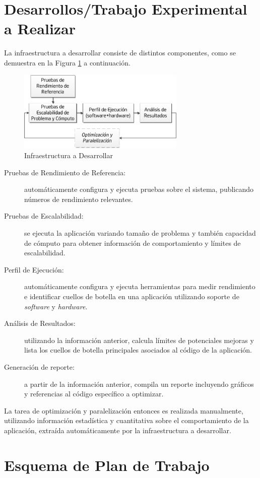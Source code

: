 \documentclass[a4paper]{article}
\begin{document}
\section{Desarrollos/Trabajo Experimental a Realizar}

La infraestructura a desarrollar consiste de distintos componentes, como se demuestra en la Figura \ref{fig:framework} a continuación.

\begin{figure}[H]
\centering
\includegraphics[width=8cm]{framework.png}
\caption{Infraestructura a Desarrollar}
\label{fig:framework}
\end{figure}
  \begin{description}
  \item[Pruebas de Rendimiento de Referencia:] automáticamente configura y ejecuta pruebas sobre el sistema, publicando números de rendimiento relevantes.
 \item[Pruebas de Escalabilidad:] se ejecuta la aplicación variando tamaño de problema y también capacidad de cómputo para obtener información de comportamiento y límites de escalabilidad.
  \item[Perfil de Ejecución:] automáticamente configura y ejecuta herramientas para medir rendimiento e identificar cuellos de botella en una aplicación utilizando soporte de {\it software} y {\it hardware}.
  \item[Análisis de Resultados:] utilizando la información anterior, calcula límites de potenciales mejoras y lista los cuellos de botella principales asociados al código de la aplicación.
  \item[Generación de reporte:] a partir de la información anterior, compila un reporte incluyendo gráficos y referencias al código específico a optimizar.
  \end{description}

La tarea de optimización y paralelización entonces es realizada manualmente, utilizando información estadística y cuantitativa sobre el comportamiento de la aplicación, extraída automáticamente por la infraestructura a desarrollar.

\section{Esquema de Plan de Trabajo}
\end{document}
